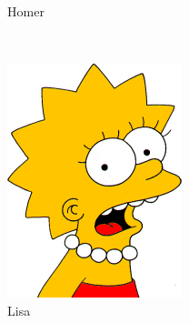 \documentclass[paper=a4, fontsize=11pt]{scrartcl} %
\numberwithin{equation}{section} %
\numberwithin{figure}{section} %
\numberwithin{table}{section} %
\begin{document}
\begin{figure}
\begin{subfigure}[b]{0.15\textwidth}
        \caption{Homer}
        \label{fig:homer}
    \end{subfigure}
    ~ %
    \begin{subfigure}[b]{0.15\textwidth}
        \includegraphics[width=\textwidth]{lisa001}
        \caption{Lisa}
        \label{fig:lisa}
    \end{subfigure}
    ~ %
    \begin{subfigure}[b]{0.15\textwidth}

\end{subfigure}
\end{figure}
\end{document}
